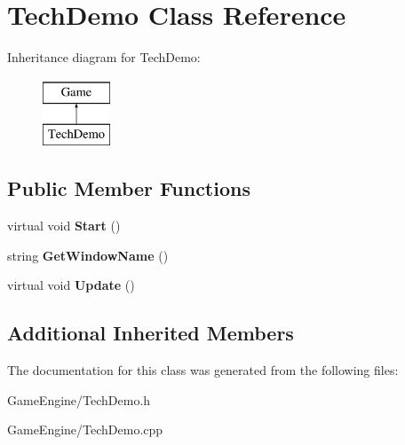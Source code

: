 \section{Tech\+Demo Class Reference}
\label{class_tech_demo}
Inheritance diagram for Tech\+Demo\+:\begin{figure}[H]
\begin{center}
\leavevmode
\includegraphics[height=2.000000cm]{class_tech_demo}
\end{center}
\end{figure}
\subsection*{Public Member Functions}
\begin{DoxyCompactItemize}
\item 
\mbox{\label{class_tech_demo_a45660677a5ccf5be251de1049cd24a22}} 
virtual void {\bfseries Start} ()
\item 
\mbox{\label{class_tech_demo_a72282352692cf2ee0a60a9968c0d2e75}} 
string {\bfseries Get\+Window\+Name} ()
\item 
\mbox{\label{class_tech_demo_a5783e0abcb3439929c0a77e3434c9fdd}} 
virtual void {\bfseries Update} ()
\end{DoxyCompactItemize}
\subsection*{Additional Inherited Members}


The documentation for this class was generated from the following files\+:\begin{DoxyCompactItemize}
\item 
Game\+Engine/Tech\+Demo.\+h\item 
Game\+Engine/Tech\+Demo.\+cpp\end{DoxyCompactItemize}
